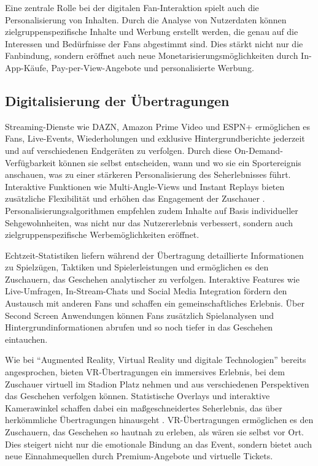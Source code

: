 \documentclass[
  number]{elsarticle}
\begin{document}
Eine zentrale Rolle bei der digitalen Fan-Interaktion spielt auch die
Personalisierung von Inhalten. Durch die Analyse von Nutzerdaten können
zielgruppenspezifische Inhalte und Werbung erstellt werden, die genau
auf die Interessen und Bedürfnisse der Fans abgestimmt sind. Dies stärkt
nicht nur die Fanbindung, sondern eröffnet auch neue
Monetarisierungsmöglichkeiten durch In-App-Käufe, Pay-per-View-Angebote
und personalisierte Werbung. \citep[pp.146-150]{glebova_digitaltech}

\subsection{Digitalisierung der
Übertragungen}\label{digitalisierung-der-uxfcbertragungen}

Streaming-Dienste wie DAZN, Amazon Prime Video und ESPN+ ermöglichen es
Fans, Live-Events, Wiederholungen und exklusive Hintergrundberichte
jederzeit und auf verschiedenen Endgeräten zu verfolgen. Durch diese
On-Demand-Verfügbarkeit können sie selbst entscheiden, wann und wo sie
ein Sportereignis anschauen, was zu einer stärkeren Personalisierung des
Seherlebnisses führt. Interaktive Funktionen wie Multi-Angle-Views und
Instant Replays bieten zusätzliche Flexibilität und erhöhen das
Engagement der Zuschauer \citep[p.~230]{iliescu_streamingahead}.
Personalisierungsalgorithmen empfehlen zudem Inhalte auf Basis
individueller Sehgewohnheiten, was nicht nur das Nutzererlebnis
verbessert, sondern auch zielgruppenspezifische Werbemöglichkeiten
eröffnet. \citep[p.~231]{iliescu_streamingahead}

Echtzeit-Statistiken liefern während der Übertragung detaillierte
Informationen zu Spielzügen, Taktiken und Spielerleistungen und
ermöglichen es den Zuschauern, das Geschehen analytischer zu verfolgen.
Interaktive Features wie Live-Umfragen, In-Stream-Chats und Social Media
Integration fördern den Austausch mit anderen Fans und schaffen ein
gemeinschaftliches Erlebnis. Über Second Screen Anwendungen können Fans
zusätzlich Spielanalysen und Hintergrundinformationen abrufen und so
noch tiefer in das Geschehen eintauchen.
\citep[pp.~7-9]{zheng_digitalization}

Wie bei ``Augmented Reality, Virtual Reality und digitale Technologien''
bereits angesprochen, bieten VR-Übertragungen ein immersives Erlebnis,
bei dem Zuschauer virtuell im Stadion Platz nehmen und aus verschiedenen
Perspektiven das Geschehen verfolgen können. Statistische Overlays und
interaktive Kamerawinkel schaffen dabei ein maßgeschneidertes
Seherlebnis, das über herkömmliche Übertragungen hinausgeht
\citep[p.~230]{iliescu_streamingahead}. VR-Übertragungen ermöglichen es
den Zuschauern, das Geschehen so hautnah zu erleben, als wären sie
selbst vor Ort. Dies steigert nicht nur die emotionale Bindung an das
Event, sondern bietet auch neue Einnahmequellen durch Premium-Angebote
und virtuelle Tickets.
\end{document}
